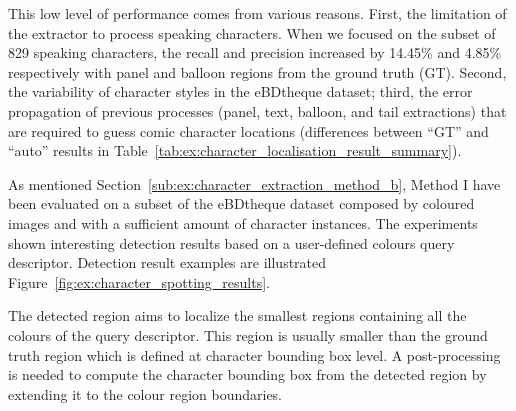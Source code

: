 This low level of performance comes from various reasons.
First, the limitation of the extractor to process speaking characters.
When we focused on the subset of 829 speaking characters, the recall and precision increased by 14.45\% and 4.85\% respectively with panel and balloon regions from the ground truth (GT).
Second, the variability of character styles in the eBDtheque dataset; third, the error propagation of previous processes (panel, text, balloon, and tail extractions) that are required to guess comic character locations (differences between ``GT'' and ``auto'' results in Table~\ref{tab:ex:character_localisation_result_summary}).





As mentioned Section~\ref{sub:ex:character_extraction_method_b}, Method I have been evaluated on a subset of the eBDtheque dataset composed by coloured images and with a sufficient amount of character instances.
The experiments shown interesting detection results based on a user-defined colours query descriptor.
Detection result examples are illustrated Figure~\ref{fig:ex:character_spotting_results}.

The detected region aims to localize the smallest regions containing all the colours of the query descriptor.
This region is usually smaller than the ground truth region which is defined at character bounding box level.
A post-processing is needed to compute the character bounding box from the detected region by extending it to the colour region boundaries.

